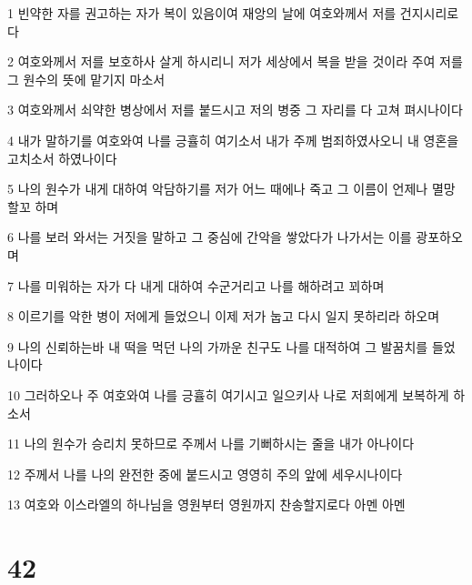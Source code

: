 \par 1 빈약한 자를 권고하는 자가 복이 있음이여 재앙의 날에 여호와께서 저를 건지시리로다
\par 2 여호와께서 저를 보호하사 살게 하시리니 저가 세상에서 복을 받을 것이라 주여 저를 그 원수의 뜻에 맡기지 마소서
\par 3 여호와께서 쇠약한 병상에서 저를 붙드시고 저의 병중 그 자리를 다 고쳐 펴시나이다
\par 4 내가 말하기를 여호와여 나를 긍휼히 여기소서 내가 주께 범죄하였사오니 내 영혼을 고치소서 하였나이다
\par 5 나의 원수가 내게 대하여 악담하기를 저가 어느 때에나 죽고 그 이름이 언제나 멸망할꼬 하며
\par 6 나를 보러 와서는 거짓을 말하고 그 중심에 간악을 쌓았다가 나가서는 이를 광포하오며
\par 7 나를 미워하는 자가 다 내게 대하여 수군거리고 나를 해하려고 꾀하며
\par 8 이르기를 악한 병이 저에게 들었으니 이제 저가 눕고 다시 일지 못하리라 하오며
\par 9 나의 신뢰하는바 내 떡을 먹던 나의 가까운 친구도 나를 대적하여 그 발꿈치를 들었나이다
\par 10 그러하오나 주 여호와여 나를 긍휼히 여기시고 일으키사 나로 저희에게 보복하게 하소서
\par 11 나의 원수가 승리치 못하므로 주께서 나를 기뻐하시는 줄을 내가 아나이다
\par 12 주께서 나를 나의 완전한 중에 붙드시고 영영히 주의 앞에 세우시나이다
\par 13 여호와 이스라엘의 하나님을 영원부터 영원까지 찬송할지로다 아멘 아멘

\chapter{42}

